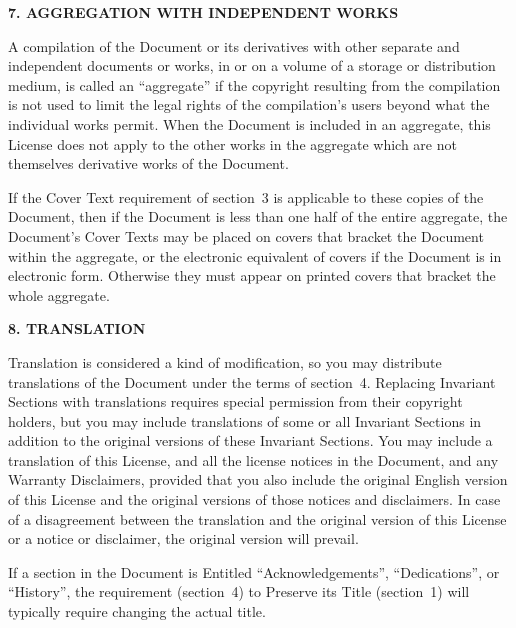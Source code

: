 \begin{center}
{\Large\bf 7. AGGREGATION WITH INDEPENDENT WORKS\par}
\end{center}


A compilation of the Document or its derivatives with other separate
and independent documents or works, in or on a volume of a storage or
distribution medium, is called an ``aggregate'' if the copyright
resulting from the compilation is not used to limit the legal rights
of the compilation's users beyond what the individual works permit.
When the Document is included in an aggregate, this License does not
apply to the other works in the aggregate which are not themselves
derivative works of the Document.

If the Cover Text requirement of section~3 is applicable to these
copies of the Document, then if the Document is less than one half of
the entire aggregate, the Document's Cover Texts may be placed on
covers that bracket the Document within the aggregate, or the
electronic equivalent of covers if the Document is in electronic form.
Otherwise they must appear on printed covers that bracket the whole
aggregate.


\begin{center}
{\Large\bf 8. TRANSLATION\par}
\end{center}


Translation is considered a kind of modification, so you may
distribute translations of the Document under the terms of section~4.
Replacing Invariant Sections with translations requires special
permission from their copyright holders, but you may include
translations of some or all Invariant Sections in addition to the
original versions of these Invariant Sections.  You may include a
translation of this License, and all the license notices in the
Document, and any Warranty Disclaimers, provided that you also include
the original English version of this License and the original versions
of those notices and disclaimers.  In case of a disagreement between
the translation and the original version of this License or a notice
or disclaimer, the original version will prevail.

If a section in the Document is Entitled ``Acknowledgements'',
``Dedications'', or ``History'', the requirement (section~4) to Preserve
its Title (section~1) will typically require changing the actual
title.


